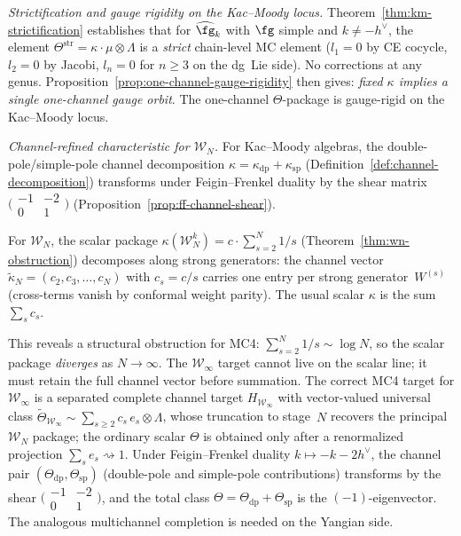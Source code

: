 \emph{Strictification and gauge rigidity on the Kac--Moody locus.}
Theorem~\ref{thm:km-strictification} establishes that for
$\widehat{\fg}_k$ with $\fg$ simple and $k \neq -h^\vee$,
the element $\Theta^{\mathrm{str}} = \kappa \cdot \mu \otimes
\Lambda$ is a \emph{strict} chain-level MC element
($l_1 = 0$ by CE cocycle, $l_2 = 0$ by Jacobi, $l_n = 0$ for
$n \geq 3$ on the dg~Lie side).  No corrections at any genus.
Proposition~\ref{prop:one-channel-gauge-rigidity} then gives:
\emph{fixed $\kappa$ implies a single one-channel gauge orbit}.
The one-channel $\Theta$-package is gauge-rigid on the
Kac--Moody locus.

\emph{Channel-refined characteristic for $\mathcal{W}_N$.}
For Kac--Moody algebras, the double-pole/simple-pole channel
decomposition $\kappa = \kappa_{\mathrm{dp}} + \kappa_{\mathrm{sp}}$
(Definition~\ref{def:channel-decomposition}) transforms under
Feigin--Frenkel duality by the shear matrix
$\bigl(\begin{smallmatrix} -1 & -2 \\ 0 & 1
\end{smallmatrix}\bigr)$
(Proposition~\ref{prop:ff-channel-shear}).

For $\mathcal{W}_N$, the scalar package
$\kappa(\mathcal{W}_N^k) = c \cdot \sum_{s=2}^N 1/s$
(Theorem~\ref{thm:wn-obstruction})
decomposes along strong generators:
the channel vector
$\tilde{\kappa}_N = (c_2, c_3, \ldots, c_N)$ with $c_s = c/s$
carries one entry per strong generator~$W^{(s)}$ (cross-terms
vanish by conformal weight parity).
The usual scalar $\kappa$ is the sum $\sum_s c_s$.

This reveals a structural obstruction for MC4:
$\sum_{s=2}^N 1/s \sim \log N$, so the scalar package
\emph{diverges} as $N \to \infty$.  The $\mathcal{W}_\infty$ target
cannot live on the scalar line; it must retain the full channel
vector before summation.  The correct MC4 target for
$\mathcal{W}_\infty$ is a separated complete channel target
$H_{\mathcal{W}_\infty}$ with vector-valued universal class
$\tilde{\Theta}_{\mathcal{W}_\infty} \sim
\sum_{s \geq 2} c_s\, e_s \otimes \Lambda$,
whose truncation to stage~$N$ recovers the principal
$\mathcal{W}_N$ package; the ordinary scalar $\Theta$ is obtained
only after a renormalized projection $\sum_s e_s \rightsquigarrow 1$.
Under Feigin--Frenkel duality $k \mapsto -k - 2h^\vee$, the
channel pair $(\Theta_{\mathrm{dp}}, \Theta_{\mathrm{sp}})$
(double-pole and simple-pole contributions) transforms by the
shear $\bigl(\begin{smallmatrix} -1 & -2 \\ 0 & 1
\end{smallmatrix}\bigr)$, and the total class
$\Theta = \Theta_{\mathrm{dp}} + \Theta_{\mathrm{sp}}$ is
the $(-1)$-eigenvector.
The analogous multichannel completion is needed on the Yangian side.

